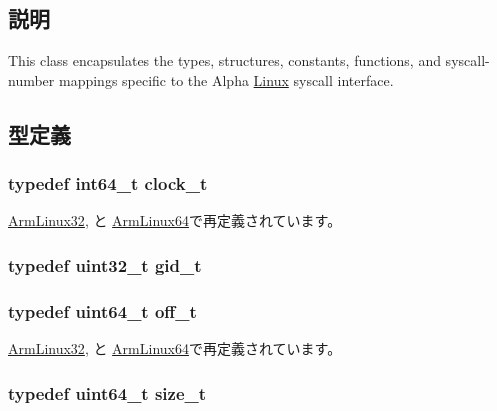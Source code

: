 \subsection{説明}
This class encapsulates the types, structures, constants, functions, and syscall-\/number mappings specific to the Alpha \hyperlink{classLinux}{Linux} syscall interface. 

\subsection{型定義}
\hypertarget{classLinux_a0001c50514d27f51d408e051dc803ad4}{
\subsubsection[{clock\_\-t}]{\setlength{\rightskip}{0pt plus 5cm}typedef int64\_\-t {\bf clock\_\-t}}}
\label{classLinux_a0001c50514d27f51d408e051dc803ad4}


\hyperlink{classArmLinux32_af9bbc36b03eced2f192e46d55e703b58}{ArmLinux32}, と \hyperlink{classArmLinux64_a0001c50514d27f51d408e051dc803ad4}{ArmLinux64}で再定義されています。\hypertarget{classLinux_aa7352f1065fe606194d792e2b292cf83}{
\subsubsection[{gid\_\-t}]{\setlength{\rightskip}{0pt plus 5cm}typedef {\bf uint32\_\-t} {\bf gid\_\-t}}}
\label{classLinux_aa7352f1065fe606194d792e2b292cf83}
\hypertarget{classLinux_a2cb84cf5f02a29b7e8f237ff151a9225}{
\subsubsection[{off\_\-t}]{\setlength{\rightskip}{0pt plus 5cm}typedef uint64\_\-t {\bf off\_\-t}}}
\label{classLinux_a2cb84cf5f02a29b7e8f237ff151a9225}


\hyperlink{classArmLinux32_aac46e03c2018bada012333c31f41df12}{ArmLinux32}, と \hyperlink{classArmLinux64_a2cb84cf5f02a29b7e8f237ff151a9225}{ArmLinux64}で再定義されています。\hypertarget{classLinux_a186ea1339bffb378854987065835afe3}{
\subsubsection[{size\_\-t}]{\setlength{\rightskip}{0pt plus 5cm}typedef uint64\_\-t {\bf size\_\-t}}}
\label{classLinux_a186ea1339bffb378854987065835afe3}


